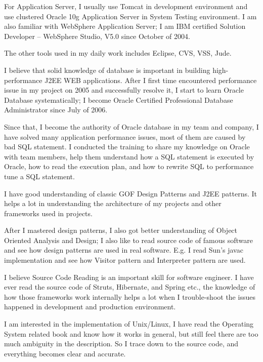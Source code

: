 For Application Server, I usually use Tomcat in development environment and
use clustered Oracle 10g Application Server in System Testing environment. 
I am also familiar with WebSphere Application Server; 
I am IBM certified Solution Developer -- WebSphere Studio, V5.0 since October of 2004.

The other tools used in my daily work includes Eclipse, CVS, VSS, Jude.

\par
I believe that solid knowledge of database is
 important in building high-performance J2EE WEB applications. 
After I first time encountered performance issue in my project on 2005 and 
successfully resolve it, I start to learn Oracle Database systematically; 
I become Oracle Certified Professional Database Administrator since July of 2006. 

Since that, I become the authority of Oracle database in my team and company, 
I have solved many application performance issues, most of them are caused 
by bad SQL statement. I conducted the training to share my knowledge on Oracle
with team members, help them understand how a SQL statement is executed by Oracle,
how to read the execution plan, and how to rewrite SQL to performance tune a SQL statement.


I have good understanding of classic GOF Design Patterns and J2EE patterns. 
It helps a lot in understanding the architecture of my projects and other 
frameworks used in projects. 

After I mastered design patterns, I also got better understanding of Object Oriented
 Analysis and Design;  
I also like to read source code of famous software and see how design patterns are
used in real software. E.g. I read Sun's javac implementation and see how Visitor
pattern and Interpreter pattern are used. 

    
\par
I believe Source Code Reading is an important skill for software engineer.
I have ever read the source code of Struts, Hibernate, and Spring etc., 
the knowledge of how those frameworks work internally helps a lot when I trouble-shoot 
the issues happened in development and production environment. 

I am interested in the implementation of Unix/Linux, I have read the Operating 
System related book and know how it works in general, but still feel there 
are too much ambiguity in the description. So I trace down to the source code, and
everything becomes clear and accurate. 

